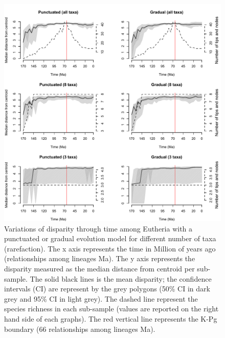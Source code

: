 \begin{figure}
\centering
    \includegraphics[keepaspectratio=true]{Supplementaries/Figures/STD/Rarefaction-beck.pdf}
\caption[Eutheria disparity (rarefied)]{Variations of disparity through time among Eutheria with a punctuated or gradual evolution model for different number of taxa (rarefaction). The x axis represents the time in Million of years ago (relationships among lineages
Ma). The y axis represents the disparity measured as the median distance from centroid per sub-sample. The solid black lines is the mean disparity; the confidence intervals (CI) are represent by the grey polygons (50\% CI in dark grey and 95\% CI in light grey). The dashed line represent the species richness in each sub-sample (values are reported on the right hand side of each graphs). The red vertical line represents the K-Pg boundary (66 relationships among lineages
Ma).}
\label{Supp_Eutheria_rarefied}
\end{figure}

\newpage
